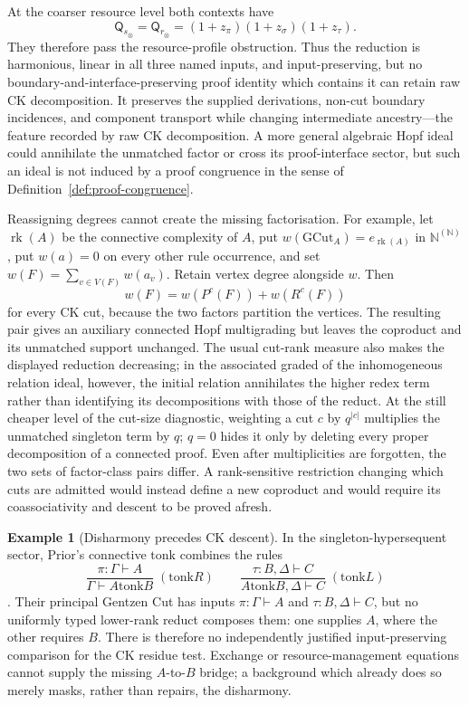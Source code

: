 \documentclass[10pt,a4paper]{article}
\theoremstyle{plain}
\theoremstyle{definition}
\newtheorem{example}[theorem]{Example}
\theoremstyle{remark}
\newcommand{\ms}{\mathrel{\vdash}}
\begin{document}
At the coarser resource level both contexts have
\[
 \mathsf Q_{s_\otimes}=\mathsf Q_{r_\otimes}
   =(1+z_\pi)(1+z_\sigma)(1+z_\tau).
\]
They therefore pass the resource-profile obstruction.  Thus the reduction
is harmonious, linear in all three named inputs, and input-preserving, but no
boundary-and-interface-preserving proof identity which contains it can retain
raw CK decomposition.  It preserves the supplied derivations,
non-cut boundary incidences, and component transport while changing
intermediate ancestry---the feature recorded by raw CK decomposition.  A
more general algebraic Hopf ideal could annihilate the unmatched factor or
cross its proof-interface sector, but such an ideal is not induced by a proof
congruence in the sense of Definition~\ref{def:proof-congruence}.

Reassigning degrees cannot create the missing factorisation.  For example,
let \(\operatorname{rk}(A)\) be the connective complexity of \(A\), put
\(w(\mathrm{GCut}_A)=e_{\operatorname{rk}(A)}\) in
\(\mathbb N^{(\mathbb N)}\), put \(w(a)=0\) on every other rule occurrence,
and set \(w(F)=\sum_{v\in V(F)}w(a_v)\).  Retain vertex degree alongside
\(w\).  Then
\[
 w(F)=w(P^c(F))+w(R^c(F))
\]
for every CK cut, because the two factors partition the vertices.  The
resulting pair gives an auxiliary connected Hopf multigrading but leaves the
coproduct and its unmatched support unchanged.  The usual cut-rank measure
also makes the displayed reduction decreasing; in the associated graded of
the inhomogeneous relation ideal, however, the initial relation annihilates
the higher redex term rather than identifying its decompositions with those
of the reduct.  At the still cheaper level of the cut-size diagnostic,
weighting a cut \(c\) by \(q^{|c|}\) multiplies the unmatched singleton term
by \(q\); \(q=0\) hides it only by deleting every proper decomposition of a
connected proof.  Even after multiplicities are forgotten, the two sets of
factor-class pairs differ.  A rank-sensitive restriction changing which
cuts are admitted would instead define a new coproduct and would require its
coassociativity and descent to be proved afresh.

\begin{example}[Disharmony precedes CK descent]
\label{ex:tonk-disharmony}
In the singleton-hypersequent sector, Prior's connective
\(\mathbin{\mathrm{tonk}}\) combines the rules
\[
 \frac{\pi:\Gamma\ms A}
      {\Gamma\ms A\mathbin{\mathrm{tonk}}B}\;(\mathrm{tonk}R)
 \qquad
 \frac{\tau:B,\Delta\ms C}
      {A\mathbin{\mathrm{tonk}}B,\Delta\ms C}\;(\mathrm{tonk}L)
\]
\cite{prior1960}.  Their principal Gentzen Cut has inputs
\(\pi:\Gamma\ms A\) and \(\tau:B,\Delta\ms C\), but no uniformly typed
lower-rank reduct composes them: one supplies \(A\), where the other
requires \(B\).  There is therefore no independently justified
input-preserving comparison for the CK residue test.  Exchange or
resource-management equations cannot supply the missing
\(A\)-to-\(B\) bridge; a background which already does so merely masks,
rather than repairs, the disharmony.
\end{example}
\end{document}
